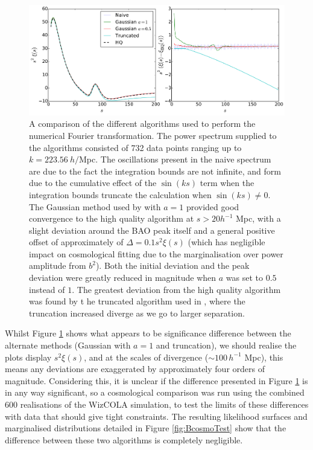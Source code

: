 \documentclass[titlesmallcaps, examinerscopy, copyrightpage]{uqthesis}
\begin{document}
\begin{appendices}
\begin{figure}[h!]
  \begin{center}
    \includegraphics[width=\textwidth]{images/Bxi.pdf}
  \end{center}
  \caption{A comparison of the different algorithms used to perform the numerical Fourier transformation. The power spectrum supplied to the algorithms consisted of 732 data points ranging up to $k = 223.56 \ h/$Mpc. The oscillations present in the naive spectrum are due to the fact the integration bounds are not infinite, and form due to the cumulative effect of the $\sin(ks)$ term when the integration bounds truncate the calculation when $\sin(ks) \neq 0$. The Gaussian method used by \citet{AndersonAubourg2012} with $a=1$ provided good convergence to the high quality algorithm at $s > 20 h^{-1}$ Mpc, with a slight deviation around the BAO peak itself and a general positive offset of approximately of $\Delta = 0.1 s^2 \xi(s)$ (which has negligible impact on cosmological fitting due to the marginalisation over power amplitude from $b^2$). Both the initial deviation and the peak deviation were greatly reduced in magnitude when $a$ was set to $0.5$ instead of $1$. The greatest deviation from the high quality algorithm was found by t he truncated algorithm used in \citet{BlakeDavis2011}, where the truncation increased diverge as we go to larger separation.}
  \label{fig:pk2xicomp}
\end{figure}

Whilst Figure \ref{fig:pk2xicomp} shows what appears to be significance difference between the alternate methods (Gaussian with $a=1$ and truncation), we should realise the plots display $s^2 \xi(s)$, and at the scales of divergence ($\sim 100\, h^{-1}$ Mpc), this means any deviations are exaggerated by approximately four orders of magnitude. Considering this, it is unclear if the difference presented in Figure \ref{fig:pk2xicomp} is in any way significant, so a cosmological comparison was run using the combined 600 realisations of the WizCOLA simulation, to test the limits of these differences with data that should give tight constraints. The resulting likelihood surfaces and marginalised distributions detailed in Figure \ref{fig:BcosmoTest} show that the difference between these two algorithms is completely negligible.


\end{appendices}
\end{document}

